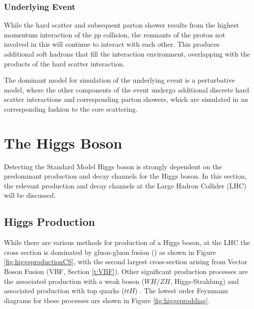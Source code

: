		\subsubsection{Underlying Event}
		\label{t:underlying}

			While the hard scatter and subsequent parton shower results from the highest momentum interaction of the $pp$ collision, the remnants of the proton not involved in this will continue to interact with each other. This produces additional soft hadrons that fill the interaction environment, overlapping with the products of the hard scatter interaction.

			The dominant model for simulation of the underlying event is a perturbative model, where the other components of the event undergo additional discrete hard scatter interactions and corresponding parton showers, which are simulated in an corresponding fashion to the core scattering.



\section{The Higgs Boson}
\label{t:higgs}

	Detecting the Standard Model Higgs boson is strongly dependent on the predominant production and decay channels for the Higgs boson. In this section, the relevant production and decay channels at the Large Hadron Collider (LHC) will be discussed.

	\subsection{Higgs Production}

		While there are various methods for production of a Higgs boson, at the LHC the cross section is dominated by gluon-gluon fusion (\ggF) as shown in Figure \ref{fig:higgsproductionCS}, with the second largest cross-section arising from Vector Boson Fusion (VBF, Section \ref{t:VBF}). Other significant production processes are the associated production with a weak boson ($WH/ZH$, Higgs-Strahlung) and associated production with top quarks ($ttH$) \cite{LHCHiggsCS}. The lowest order Feynmann diagrams for these processes are shown in Figure \ref{fig:higgsproddiag}.

